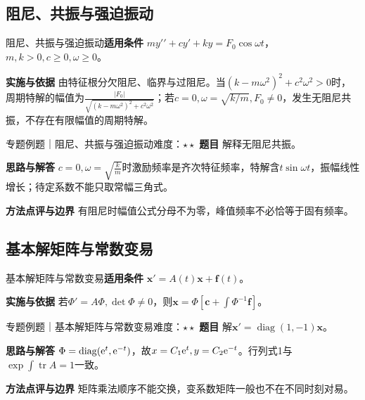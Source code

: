 \subsection{阻尼、共振与强迫振动}\label{mat:ode_systems:oscillation}
\begin{method}{阻尼、共振与强迫振动}\textbf{适用条件} $my\prime\prime+cy\prime+ky=F_0\cos\omega t$，$m,k>0,c\ge0,\omega\ge0$。\par\textbf{实施与依据} 由特征根分欠阻尼、临界与过阻尼。当$(k-m\omega^2)^2+c^2\omega^2>0$时，周期特解的幅值为$\frac{|F_0|}{\sqrt{(k-m\omega^2)^2+c^2\omega^2}}$；若$c=0,\omega=\sqrt{k/m},F_0\ne0$，发生无阻尼共振，不存在有限幅值的周期特解。\end{method}
\begin{example}{专题例题｜阻尼、共振与强迫振动}{难度：$\star\star$}
\textbf{题目} 解释无阻尼共振。\par\textbf{思路与解答} $c=0,\omega=\sqrt{\frac{k}{m}}$时激励频率是齐次特征频率，特解含$t\sin\omega t$，振幅线性增长；待定系数不能只取常幅三角式。\par\textbf{方法点评与边界} 有阻尼时幅值公式分母不为零，峰值频率不必恰等于固有频率。
\end{example}
\subsection{基本解矩阵与常数变易}\label{mat:ode_systems:fundamental}
\begin{method}{基本解矩阵与常数变易}\textbf{适用条件} $\bm x\prime=A(t)\bm x+\bm f(t)$。\par\textbf{实施与依据} 若$\Phi\prime=A\Phi,\det\Phi\ne0$，则$\bm x=\Phi[\bm c+\int\Phi^{-1}\bm f]$。\end{method}
\begin{example}{专题例题｜基本解矩阵与常数变易}{难度：$\star\star$}
\textbf{题目} 解$\bm x\prime=\operatorname{diag}(1,-1)\bm x$。\par\textbf{思路与解答} $\Phi=\operatorname{diag}(\mathrm{e}^t,\mathrm{e}^{-t})$，故$x=C_1\mathrm{e}^t,y=C_2\mathrm{e}^{-t}$。行列式1与$\exp\int\operatorname{tr}A=1$一致。\par\textbf{方法点评与边界} 矩阵乘法顺序不能交换，变系数矩阵一般也不在不同时刻对易。
\end{example}
